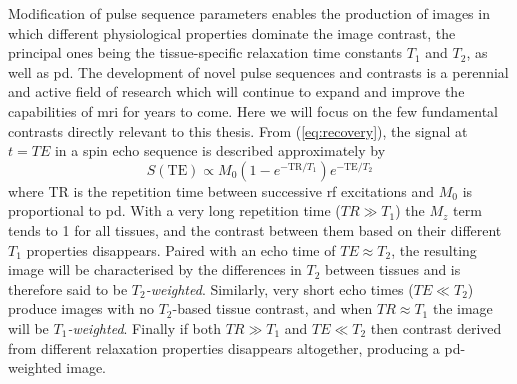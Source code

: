 Modification of pulse sequence parameters enables the production of images in which different physiological properties dominate the image contrast, the principal ones being the tissue-specific relaxation time constants $T_1$ and $T_2$, as well as \gls{pd}.
The development of novel pulse sequences and contrasts is a perennial and active field of research which will continue to expand and improve the capabilities of \gls{mri} for years to come.
Here we will focus on the few fundamental contrasts directly relevant to this thesis.
From (\ref{eq:recovery}), the signal at $t=TE$ in a spin echo sequence is described approximately by
\begin{equation}
  S(\text{TE}) \propto M_0 (1-e^{-\text{TR}/T_1})e^{-\text{TE}/T_2}
\end{equation}
where TR is the repetition time between successive \gls{rf} excitations and $M_0$ is proportional to \gls{pd}.
With a very long repetition time ($TR\gg T_1$) the $M_z$ term tends to 1 for all tissues, and the contrast between them based on their different $T_1$ properties disappears.
Paired with an echo time of $TE\approx T_2$, the resulting image will be characterised by the differences in $T_2$ between tissues and is therefore said to be \textit{$T_2$-weighted}.
Similarly, very short echo times ($TE\ll T_2$) produce images with no $T_2$-based tissue contrast, and when $TR\approx T_1$ the image will be \textit{$T_1$-weighted}.
Finally if both $TR\gg T_1$ and $TE\ll T_2$ then contrast derived from different relaxation properties disappears altogether, producing a \gls{pd}-weighted image.

